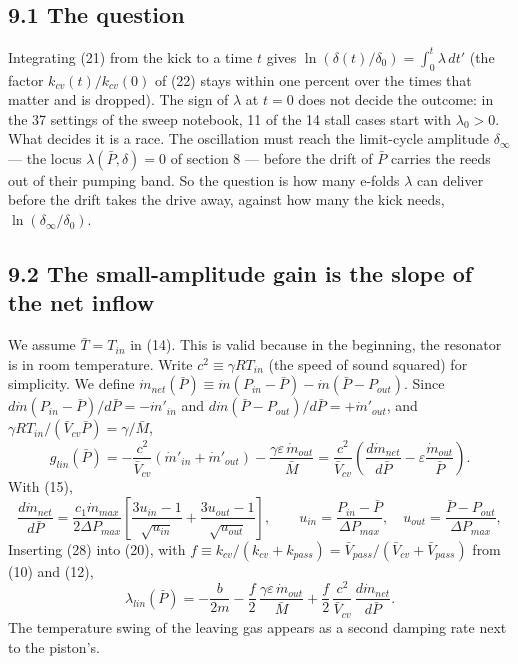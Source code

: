 \documentclass[11pt]{article}
\begin{document}
\subsection*{9.1 The question}

Integrating (21) from the kick to a time $t$ gives $\ln\left(\delta(t)/\delta_0\right) = \int_0^t \lambda\,dt'$ (the factor $k_{cv}(t)/k_{cv}(0)$ of (22) stays within one percent over the times that matter and is dropped). The sign of $\lambda$ at $t = 0$ does not decide the outcome: in the 37 settings of the sweep notebook, 11 of the 14 stall cases start with $\lambda_0 > 0$. What decides it is a race. The oscillation must reach the limit-cycle amplitude $\delta_\infty$ --- the locus $\lambda(\bar P, \delta) = 0$ of section 8 --- before the drift of $\bar P$ carries the reeds out of their pumping band. So the question is how many e-folds $\lambda$ can deliver before the drift takes the drive away, against how many the kick needs, $\ln(\delta_\infty/\delta_0)$.

\subsection*{9.2 The small-amplitude gain is the slope of the net inflow}

We assume $\bar T = T_{in}$ in (14). This is valid because in the beginning, the resonator is in room temperature. Write $c^2 \equiv \gamma RT_{in}$ (the speed of sound squared) for simplicity. We define $\dot m_{net}(\bar P) \equiv \dot m(P_{in} - \bar P) - \dot m(\bar P - P_{out})$. Since $d\dot m(P_{in} - \bar P)/d\bar P = -\dot m'_{in}$ and $d\dot m(\bar P - P_{out})/d\bar P = +\dot m'_{out}$, and $\gamma RT_{in}/(\bar V_{cv}\bar P) = \gamma/\bar M$,
\begin{equation}
g_{lin}(\bar P) = -\frac{c^2}{\bar V_{cv}}\left(\dot m'_{in} + \dot m'_{out}\right) - \frac{\gamma\varepsilon\,\dot m_{out}}{\bar M} = \frac{c^2}{\bar V_{cv}}\left(\frac{d\dot m_{net}}{d\bar P} - \varepsilon\frac{\dot m_{out}}{\bar P}\right) . \tag{28}
\end{equation}
With (15),
\begin{equation}
\frac{d\dot m_{net}}{d\bar P} = \frac{c_1\dot m_{max}}{2\Delta P_{max}}\left[\frac{3u_{in}-1}{\sqrt{u_{in}}} + \frac{3u_{out}-1}{\sqrt{u_{out}}}\right], \qquad u_{in} = \frac{P_{in} - \bar P}{\Delta P_{max}}, \quad u_{out} = \frac{\bar P - P_{out}}{\Delta P_{max}}, \tag{29}
\end{equation}
Inserting (28) into (20), with $f \equiv k_{cv}/(k_{cv} + k_{pass}) = \bar V_{pass}/(\bar V_{cv} + \bar V_{pass})$ from (10) and (12),
\begin{equation}
\lambda_{lin}(\bar P) = -\frac{b}{2m} - \frac{f}{2}\,\frac{\gamma\varepsilon\,\dot m_{out}}{\bar M} + \frac{f}{2}\,\frac{c^2}{\bar V_{cv}}\,\frac{d\dot m_{net}}{d\bar P} . \tag{30}
\end{equation}
The temperature swing of the leaving gas appears as a second damping rate next to the piston's.
\end{document}
